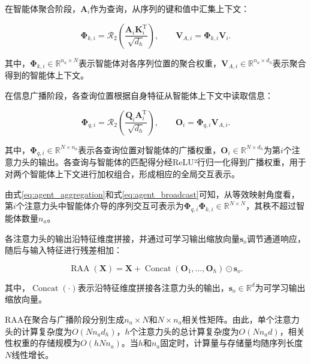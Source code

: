 在智能体聚合阶段，$\mathbf A_i$作为查询，从序列的键和值中汇集上下文：

\begin{equation}
\boldsymbol{\Phi}_{k,i}
=
\mathcal R_2
\left(
\frac{\mathbf A_i\mathbf K_i^{\mathrm T}}{\sqrt{d_h}}
\right),
\qquad
\mathbf V_{A,i}
=
\boldsymbol{\Phi}_{k,i}\mathbf V_i.
\label{eq:agent_aggregation}
\end{equation}

其中，$\boldsymbol{\Phi}_{k,i}\in\mathbb R^{n_a\times N}$表示智能体对各序列位置的聚合权重，$\mathbf V_{A,i}\in\mathbb R^{n_a\times d_h}$表示聚合得到的智能体上下文。

在信息广播阶段，各查询位置根据自身特征从智能体上下文中读取信息：

\begin{equation}
\boldsymbol{\Phi}_{q,i}
=
\mathcal R_2
\left(
\frac{\mathbf Q_i\mathbf A_i^{\mathrm T}}{\sqrt{d_h}}
\right),
\qquad
\mathbf O_i
=
\boldsymbol{\Phi}_{q,i}\mathbf V_{A,i}.
\label{eq:agent_broadcast}
\end{equation}

其中，$\boldsymbol{\Phi}_{q,i}\in\mathbb R^{N\times n_a}$表示各查询位置对智能体的广播权重，$\mathbf O_i\in\mathbb R^{N\times d_h}$为第$i$个注意力头的输出。各查询与智能体的匹配得分经ReLU²行归一化得到广播权重，用于对两个智能体上下文进行加权组合，形成相应的全局交互表示。

由式\eqref{eq:agent_aggregation}和式\eqref{eq:agent_broadcast}可知，从等效映射角度看，第$i$个注意力头中智能体介导的序列交互可表示为$\boldsymbol{\Phi}_{q,i}\boldsymbol{\Phi}_{k,i}\in\mathbb R^{N\times N}$，其秩不超过智能体数量$n_a$。

各注意力头的输出沿特征维度拼接，并通过可学习输出缩放向量$\mathbf s_o$调节通道响应，随后与输入特征进行残差相加：

\begin{equation}
\operatorname{RAA}(\mathbf X)
=
\mathbf X+
\operatorname{Concat}(\mathbf O_1,\ldots,\mathbf O_h)\odot\mathbf s_o.
\label{eq:raa_output}
\end{equation}

其中，$\operatorname{Concat}(\cdot)$表示沿特征维度拼接各注意力头的输出，$\mathbf s_o\in\mathbb R^d$为可学习输出缩放向量。

RAA在聚合与广播阶段分别生成$n_a\times N$和$N\times n_a$相关性矩阵。由此，单个注意力头的计算复杂度为$O(Nn_ad_h)$，$h$个注意力头的总计算复杂度为$O(Nn_ad)$，相关性权重的存储规模为$O(hNn_a)$。当$h$和$n_a$固定时，计算量与存储量均随序列长度$N$线性增长。

